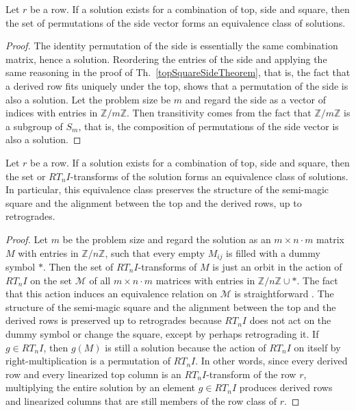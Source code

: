 \begin{corollary}
	\label{topSquareSideCorollary}
	Let $r$ be a row. If a solution exists for a combination of top, side and square, then the set of permutations of the side vector forms an equivalence class of solutions.
	\begin{proof}
		The identity permutation of the side is essentially the same combination matrix, hence a solution. Reordering the entries of the side and applying the same reasoning in the proof of Th.~\ref{topSquareSideTheorem}, that is, the fact that a derived row fits uniquely under the top, shows that a permutation of the side is also a solution. Let the problem size be $m$ and regard the side as a vector of indices with entries in $\mathbb{Z} / m \mathbb{Z}$. Then transitivity comes from the fact that $\mathbb{Z} / m \mathbb{Z}$ is a subgroup of $S_m$, that is, the composition of permutations of the side vector is also a solution.
	\end{proof}
\end{corollary}

\begin{corollary}
	Let $r$ be a row. If a solution exists for a combination of top, side and square, then the set or $RT_nI$-transforms of the solution forms an equivalence class of solutions. In particular, this equivalence class preserves the structure of the semi-magic square and the alignment between the top and the derived rows, up to retrogrades.
    \begin{proof}
    Let $m$ be the problem size and regard the solution as an $m \times n \cdot m$ matrix $M$ with entries in $\mathbb{Z} / n \mathbb{Z}$, such that every empty $M_{ij}$ is filled with a dummy symbol $*$. Then the set of $RT_nI$-transforms of $M$ is just an orbit in the action of $RT_nI$ on the set $\mathcal{M}$ of all $m \times n \cdot m$ matrices with entries in $\mathbb{Z} / n \mathbb{Z} \cup *$. The fact that this action induces an equivalence relation on $\mathcal{M}$ is straightforward \cite[102]{Rotman1967} \cite[114]{DummitFoote2004} \cite[250]{Tucker1974}. The structure of the semi-magic square and the alignment between the top and the derived rows is preserved up to retrogrades because $RT_nI$ does not act on the dummy symbol or change the square, except by perhaps retrograding it. If $g \in RT_nI$, then $g(M)$ is still a solution because the action of $RT_nI$ on itself by right-multiplication is a permutation of $RT_nI$. In other words, since every derived row and every linearized top column is an $RT_nI$-transform of the row $r$, multiplying the entire solution by an element $g \in RT_nI$ produces derived rows and linearized columns that are still members of the row class of $r$.
    \end{proof}
\end{corollary}

